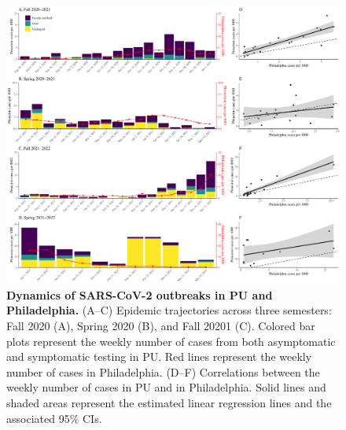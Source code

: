 \documentclass[12pt]{article}
\begin{document}
\begin{figure}[!htp]
\includegraphics[width=\textwidth]{../figure_princeton_new/figure_princeton_philly_new.pdf}
\caption{
\textbf{Dynamics of SARS-CoV-2 outbreaks in PU and Philadelphia.}
(A--C) Epidemic trajectories across three semesters: Fall 2020 (A), Spring 2020 (B), and Fall 20201 (C).
Colored bar plots represent the weekly number of cases from both asymptomatic and symptomatic testing in PU.
Red lines represent the weekly number of cases in Philadelphia.
(D--F) Correlations between the weekly number of cases in PU and in Philadelphia.
Solid lines and shaded areas represent the estimated linear regression lines and the associated 95\% CIs.
}
\end{figure}

\pagebreak
\end{document}
